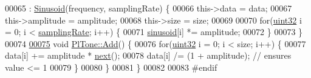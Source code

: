 \begin{DoxyCode}
00065         : \hyperlink{classradio_1_1Sinusoid}{Sinusoid}(frequency, samplingRate) \{
00066         this->data = data;
00067         this->amplitude = amplitude;
00068         this->size = size;
00069 
00070         \textcolor{keywordflow}{for}(\hyperlink{definitions_8hpp_a1134b580f8da4de94ca6b1de4d37975e}{uint32} i = 0; i < \hyperlink{classradio_1_1Sinusoid_a964d64aae9acc4ea5d752534a33d76b8}{samplingRate}; i++) \{
00071             \hyperlink{classradio_1_1Sinusoid_a56556c3d3e08d1c9481c18e087ff1c85}{sinusoid}[i] *= amplitude;
00072         \}
00073     \}
00074 
\hypertarget{PlTone_8hpp_source_l00075}{}\hyperlink{classradio_1_1PlTone_a9e19b2d5106b35626d4839f04f9b9f95}{00075}     \textcolor{keywordtype}{void} \hyperlink{classradio_1_1PlTone_a9e19b2d5106b35626d4839f04f9b9f95}{PlTone::Add}() \{
00076         \textcolor{keywordflow}{for}(\hyperlink{definitions_8hpp_a1134b580f8da4de94ca6b1de4d37975e}{uint32} i = 0; i < size; i++) \{
00077             data[i] += amplitude * \hyperlink{classradio_1_1Sinusoid_aab44298ea1bd5cb175d5826243cf56f2}{next}();
00078             data[i] /= (1 + amplitude);  \textcolor{comment}{// ensures value <= 1}
00079         \}
00080     \}
00081 \}
00082 
00083 \textcolor{preprocessor}{#endif}
\end{DoxyCode}
